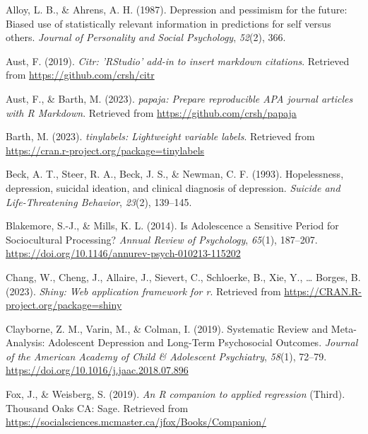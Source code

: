\documentclass[
  man,floatsintext]{apa6}
\newlength{\cslhangindent}
\newlength{\cslentryspacingunit} %
\newenvironment{CSLReferences}[2] %
 {%
  \setlength{\parindent}{0pt}
  \ifodd #1
  \let\oldpar\par
  \def\par{\hangindent=\cslhangindent\oldpar}
  \fi
  \setlength{\parskip}{#2\cslentryspacingunit}
 }%
 {}
\begin{document}
\hypertarget{refs}{}
\begin{CSLReferences}{1}{0}
\leavevmode{}%
Alloy, L. B., \& Ahrens, A. H. (1987). Depression and pessimism for the future: Biased use of statistically relevant information in predictions for self versus others. \emph{Journal of Personality and Social Psychology}, \emph{52}(2), 366.

\leavevmode{}%
Aust, F. (2019). \emph{Citr: 'RStudio' add-in to insert markdown citations}. Retrieved from \url{https://github.com/crsh/citr}

\leavevmode{}%
Aust, F., \& Barth, M. (2023). \emph{{papaja}: {Prepare} reproducible {APA} journal articles with {R Markdown}}. Retrieved from \url{https://github.com/crsh/papaja}

\leavevmode{}%
Barth, M. (2023). \emph{{tinylabels}: Lightweight variable labels}. Retrieved from \url{https://cran.r-project.org/package=tinylabels}

\leavevmode{}%
Beck, A. T., Steer, R. A., Beck, J. S., \& Newman, C. F. (1993). Hopelessness, depression, suicidal ideation, and clinical diagnosis of depression. \emph{Suicide and Life-Threatening Behavior}, \emph{23}(2), 139--145.

\leavevmode{}%
Blakemore, S.-J., \& Mills, K. L. (2014). Is {Adolescence} a {Sensitive} {Period} for {Sociocultural} {Processing}? \emph{Annual Review of Psychology}, \emph{65}(1), 187--207. \url{https://doi.org/10.1146/annurev-psych-010213-115202}

\leavevmode{}%
Chang, W., Cheng, J., Allaire, J., Sievert, C., Schloerke, B., Xie, Y., \ldots{} Borges, B. (2023). \emph{Shiny: Web application framework for r}. Retrieved from \url{https://CRAN.R-project.org/package=shiny}

\leavevmode{}%
Clayborne, Z. M., Varin, M., \& Colman, I. (2019). Systematic {Review} and {Meta}-{Analysis}: {Adolescent} {Depression} and {Long}-{Term} {Psychosocial} {Outcomes}. \emph{Journal of the American Academy of Child \& Adolescent Psychiatry}, \emph{58}(1), 72--79. \url{https://doi.org/10.1016/j.jaac.2018.07.896}

\leavevmode{}%
Fox, J., \& Weisberg, S. (2019). \emph{An {R} companion to applied regression} (Third). Thousand Oaks {CA}: Sage. Retrieved from \url{https://socialsciences.mcmaster.ca/jfox/Books/Companion/}


\end{CSLReferences}
\end{document}
